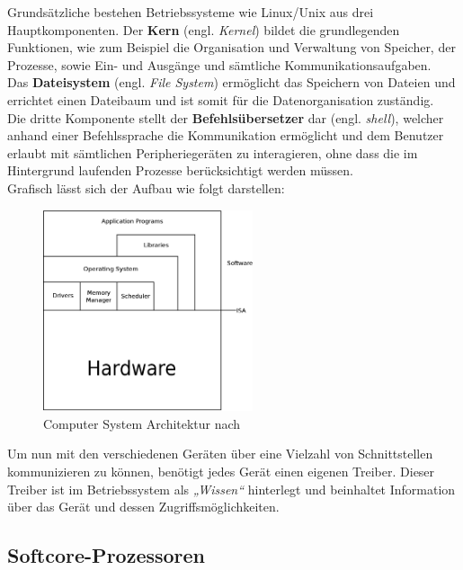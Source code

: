 Grundsätzliche bestehen Betriebssysteme wie Linux/Unix aus drei Hauptkomponenten.
Der \textbf{Kern} (engl. \emph{Kernel}) bildet die grundlegenden Funktionen, wie
zum Beispiel die Organisation und Verwaltung von Speicher, der Prozesse, sowie
Ein- und Ausgänge und sämtliche Kommunikationsaufgaben.\\
Das \textbf{Dateisystem} (engl. \emph{File System}) ermöglicht das Speichern von Dateien
und errichtet einen Dateibaum und ist somit für die Datenorganisation zuständig.\\
Die dritte Komponente stellt der \textbf{Befehlsübersetzer} dar (engl. \emph{shell}),
welcher anhand einer Befehlssprache die Kommunikation ermöglicht und dem Benutzer erlaubt
mit sämtlichen Peripheriegeräten zu interagieren, ohne dass die im Hintergrund laufenden
Prozesse berücksichtigt werden müssen.~\cite{ubuntu}\\

Grafisch lässt sich der Aufbau wie folgt darstellen:\\

\begin{figure}[H]
\centering
\includegraphics[width=0.55\textwidth]{Hauptteil/csa.eps}
\caption{Computer System Architektur nach~\cite{virtualmachines}}
\label{fig:mbs}
\end{figure}

Um nun mit den verschiedenen Geräten über eine Vielzahl von Schnittstellen kommunizieren
zu können, benötigt jedes Gerät einen eigenen Treiber. Dieser Treiber ist im Betriebssystem
als \emph{„Wissen“} hinterlegt und beinhaltet Information über das Gerät und dessen
Zugriffsmöglichkeiten.~\cite{treiber}\\


\subsection{Softcore-Prozessoren}\label{kap:softcoreprozessoren}

